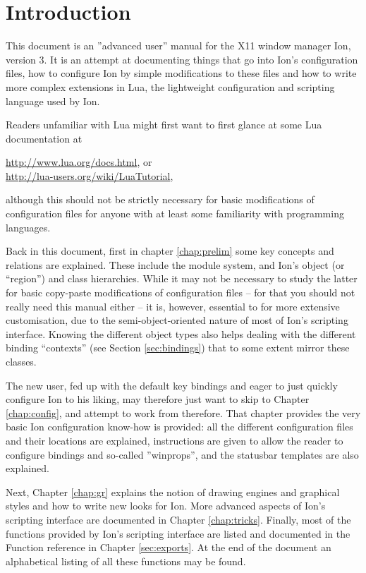 
\chapter{Introduction}

This document is an ''advanced user'' manual for the X11 window manager
Ion, version 3. It is an attempt at documenting things that go into Ion's
configuration files, how to configure Ion by simple modifications 
to these files and how to write more complex extensions in Lua, the 
lightweight configuration and scripting language used by Ion. 

Readers unfamiliar with Lua might first want to first glance at some 
Lua documentation at

\begin{center}
    \url{http://www.lua.org/docs.html}, or \\
    \url{http://lua-users.org/wiki/LuaTutorial},
\end{center}

although this should not be strictly necessary for basic modifications
of configuration files for anyone with at least some familiarity with
programming languages.

Back in this document, first in chapter \ref{chap:prelim} some key
concepts and relations are explained. These include the module system,
and Ion's object (or ``region'') and class hierarchies. While it may
not be necessary to study the latter for basic copy-paste modifications
of configuration files -- for that you should not really need this
manual either -- it is, however, essential to for more extensive
customisation, due to the semi-object-oriented nature of most of
Ion's scripting interface. Knowing the different object types also
helps dealing with the different binding ``contexts'' (see
Section \ref{sec:bindings}) that to some extent mirror these classes.

The new user, fed up with the default key bindings and eager to 
just quickly configure Ion to his liking, may therefore just want
to skip to Chapter \ref{chap:config}, and attempt to work from therefore.
That chapter provides the very basic Ion configuration know-how
is provided: all the different configuration files and their locations
are explained, instructions are given to allow the reader to
configure bindings and so-called ''winprops'', and the statusbar
templates are also explained. 

Next, Chapter \ref{chap:gr} explains the notion of drawing engines
and graphical styles and how to write new looks for Ion. More advanced
aspects of Ion's scripting interface are documented in Chapter 
\ref{chap:tricks}. 
Finally, most of the functions provided by Ion's scripting interface
are listed and documented in the Function reference in Chapter
\ref{sec:exports}. At the end of the document an alphabetical
listing of all these functions may be found.

